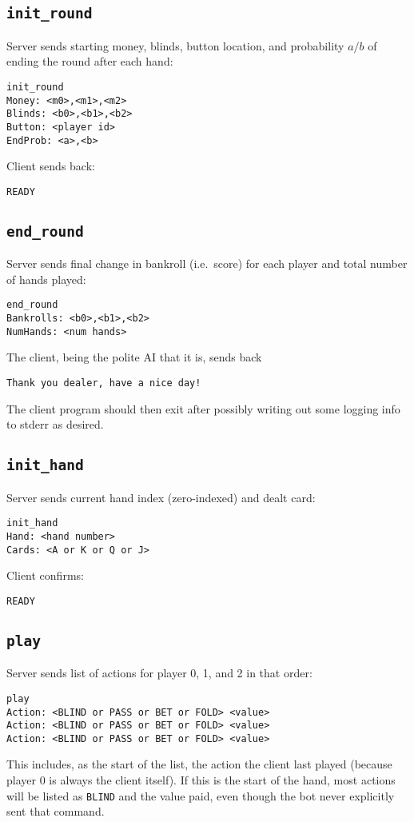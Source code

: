 \documentclass{article}
\begin{document}
\subsection{\texttt{init\_round}}
Server sends starting money, blinds, button location,
and probability $a/b$ of ending the round after each hand:
\begin{verbatim}
init_round
Money: <m0>,<m1>,<m2>
Blinds: <b0>,<b1>,<b2>
Button: <player id>
EndProb: <a>,<b>
\end{verbatim}
Client sends back:
\begin{verbatim}
READY
\end{verbatim}

\subsection{\texttt{end\_round}}
Server sends final change in bankroll (i.e.~score) for each player
and total number of hands played:
\begin{verbatim}
end_round
Bankrolls: <b0>,<b1>,<b2>
NumHands: <num hands>
\end{verbatim}
The client, being the polite AI that it is, sends back
\begin{verbatim}
Thank you dealer, have a nice day!
\end{verbatim}
The client program should then exit after possibly writing
out some logging info to stderr as desired.

\subsection{\texttt{init\_hand}}
Server sends current hand index (zero-indexed) and
dealt card:
\begin{verbatim}
init_hand
Hand: <hand number>
Cards: <A or K or Q or J>
\end{verbatim}
Client confirms:
\begin{verbatim}
READY
\end{verbatim}

\subsection{\texttt{play}}
Server sends list of actions for player 0, 1, and 2
in that order:
\begin{verbatim}
play
Action: <BLIND or PASS or BET or FOLD> <value>
Action: <BLIND or PASS or BET or FOLD> <value>
Action: <BLIND or PASS or BET or FOLD> <value>
\end{verbatim}
This includes, as the start of the list, the action the client
last played (because player 0 is always the client itself).
If this is the start of the hand, most actions will be listed
as \texttt{BLIND} and the value paid, even though the bot never
explicitly sent that command.
\end{document}
